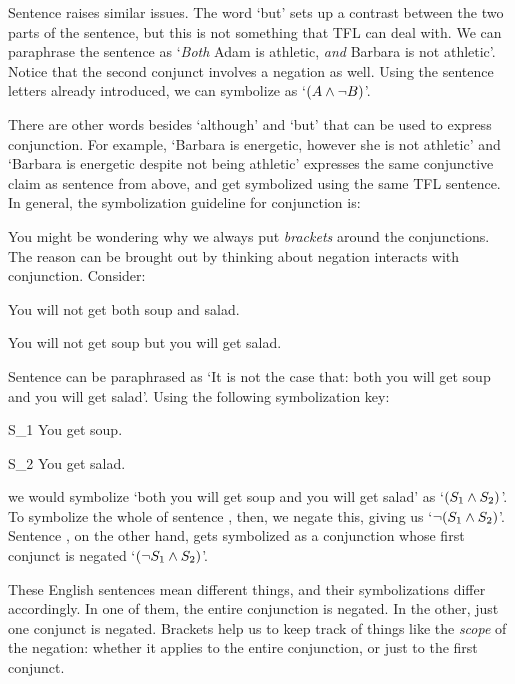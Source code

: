 Sentence  raises similar issues. The word `but' sets up a contrast between the two parts of the sentence, but this is not something that TFL can deal with. We can paraphrase the sentence as `\emph{Both} Adam is athletic, \emph{and} Barbara is not athletic'.  Notice that the second conjunct involves a negation as well.  Using the sentence letters already introduced, we can symbolize  as `$(A \wedge \neg B)$'.


There are other words besides `although' and `but' that can be used to express conjunction.  For example, `Barbara is energetic, however she is not athletic' and `Barbara is energetic despite not being athletic' expresses the same conjunctive claim as sentence  from above, and get symbolized using the same TFL sentence. In general, the symbolization guideline for conjunction is:


You might be wondering why we always put \emph{brackets} around the conjunctions. The reason can be brought out by thinking about negation interacts with conjunction. Consider:

	\begin{earg}
		\item[\ex{negcon1}] You will not get both soup and salad.
		\item[\ex{negcon2}] You will not get soup but you will get salad.
	\end{earg}

Sentence  can be paraphrased as `It is not the case that: both you will get soup and you will get salad'. Using the following symbolization key:
	\begin{ekey}
		\item[S_1] You get soup.
		\item[S_2] You get salad.
	\end{ekey}
we would symbolize `both you will get soup and you will get salad' as `$(S_1 \wedge S_2)$'. To symbolize the whole of sentence , then, we negate this, giving us `$\neg (S_1 \wedge S_2)$'. Sentence , on the other hand, gets symbolized as a conjunction whose first conjunct is negated `$(\neg S_1 \wedge S_2)$'.

These English sentences mean different things, and their symbolizations differ accordingly. In one of them, the entire conjunction is negated. In the other, just one conjunct is negated. Brackets help us to keep track of things like the \emph{scope} of the negation: whether it applies to the entire conjunction, or just to the first conjunct.


